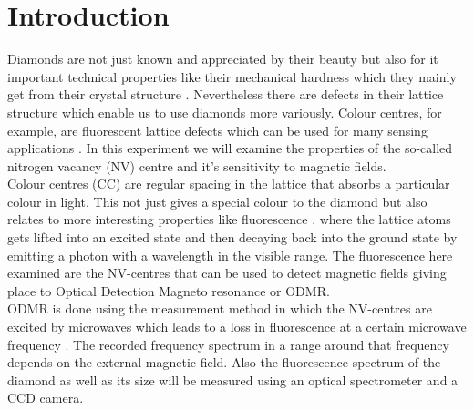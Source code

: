 \section{Introduction}

Diamonds are not just known and appreciated by their beauty but also for it important technical properties like their mechanical hardness which they mainly get from their crystal structure \cite{jelezko_single_2006}. Nevertheless there are defects in their lattice structure which enable us to use diamonds more variously. Colour centres, for example, are fluorescent lattice defects which can be used for many sensing applications \cite{anleitung}. In this experiment we will examine the properties of the so-called nitrogen vacancy (NV) centre and it's sensitivity to magnetic fields.\\

Colour centres (CC) are  regular spacing in the lattice that absorbs a particular colour in light. This not just gives a special colour to the diamond but also relates to more interesting properties like fluorescence \cite{lesik_engineering_2015}. where the lattice atoms gets lifted into an excited state and then decaying back into the ground state by emitting a photon with a wavelength in the visible range. The fluorescence here examined are the NV-centres that can be used to detect magnetic fields giving place to Optical Detection Magneto resonance or ODMR\cite{davis_mapping_2018}.\\

ODMR is done using the measurement method in which the NV-centres are excited by microwaves which leads to a loss in fluorescence at a certain microwave frequency \cite{schirhagl_nitrogen-vacancy_2014}. The recorded frequency spectrum in a range around that frequency depends on the external magnetic field. Also the fluorescence spectrum of the diamond as well as its size will be measured using an optical spectrometer and a CCD camera.